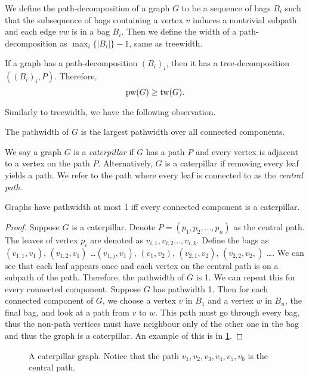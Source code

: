 We define the path-decomposition of a graph \(G\) to be a sequence of bags \(B_i\) such that the subsequence of bags containing a vertex \(v\) induces a nontrivial subpath and each edge \(vw\) is in a bag \(B_i\). Then we define the width of a path-decomposition as \(\max_i \lbrace |B_i| \rbrace -1\), same as treewidth.

If a graph has a path-decomposition \({(B_i)}_i\), then it has a tree-decomposition \(\left({(B_i)}_i, P\right)\). Therefore,
\begin{equation}
	\operatorname{pw}(G) \geq \operatorname{tw}(G).
\end{equation}

Similarly to treewidth, we have the following observation.
\begin{lemma}
	The pathwidth of \(G\) is the largest pathwidth over all connected components.
\end{lemma}
We say a graph \(G\) is a \textit{caterpillar} if \(G\) has a path \(P\) and every vertex is adjacent to a vertex on the path \(P\). Alternatively, \(G\) is a caterpillar if removing every leaf yields a path. We refer to the path where every leaf is connected to as the \textit{central path}.
\begin{theorem}[Caterpillars]
	Graphs have pathwidth at most 1 iff every connected component is a caterpillar.
\end{theorem}
\begin{proof}
	Suppose \(G\) is a caterpillar.
	Denote \(P =\left( p_1, p_2, \dots, p_n\right)\) as the central path. The leaves of vertex \(p_i\) are denoted as \(v_{i, 1}, v_{i, 2} \dots, v_{i, k}\). Define the bags as \((v_{1, 1}, v_1)\), \((v_{1, 2}, v_1)\) \dots \((v_{1, j}, v_1)\),  \((v_1, v_2)\), \((v_{2, 1}, v_2)\), \((v_{2,2}, v_2,)\) \dots. We can see that each leaf appears once and each vertex on the central path is on a subpath of the path. Therefore, the pathwidth of \(G\) is 1. We can repeat this for every connected component.
	Suppose \(G\) has pathwidth 1. Then for each connected component of \(G\), we choose a vertex \(v\) in \(B_1\) and a vertex \(w\) in \(B_n\), the final bag, and look at a path from \(v\) to \(w\). This path must go through every bag, thus the non-path vertices must have neighbour only of the other one in the bag and thus the graph is a caterpillar. An example of this is in \cref{fig:caterpillar}.
\end{proof}
\begin{figure}[ht]
	\centering
	
	\caption{A caterpillar graph. Notice that the path \(v_1, v_2, v_3, v_4, v_5, v_6\) is the central path.}
	\label{fig:caterpillar}
\end{figure}

